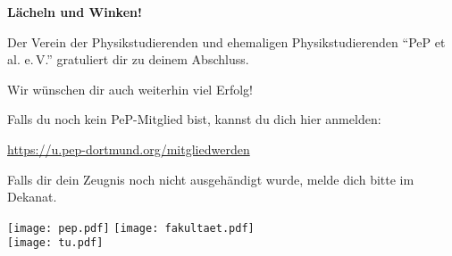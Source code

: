 \documentclass[parskip=half, fontsize=11pt]{scrartcl}
\begin{document}

\centering
\textbf{\fontsize{36}{40}\selectfont Lächeln und Winken!}

\vspace{1.0cm}

{\Large%
  Der Verein der Physikstudierenden und ehemaligen Physikstudierenden
  \enquote{PeP et al. e.\,V.} gratuliert dir zu deinem Abschluss.

  Wir wünschen dir auch weiterhin viel Erfolg!
}

\vfill

{%
  \fontsize{140}{160}\selectfont\color{yellow!85!red}%
}%

\vfill
Falls du noch kein PeP-Mitglied bist, kannst du dich hier anmelden:

{%
\hypersetup{urlcolor=black!90}%
%
}%

\url{https://u.pep-dortmund.org/mitgliedwerden}

\vfill
{\large%
  Falls dir dein Zeugnis noch nicht ausgehändigt wurde,
  melde dich bitte im Dekanat.
}


\vspace{0.5cm}

\texttt{[image: pep.pdf]}
\hfill
\texttt{[image: fakultaet.pdf]}\\[.5cm]
\texttt{[image: tu.pdf]}
  
\end{document}
